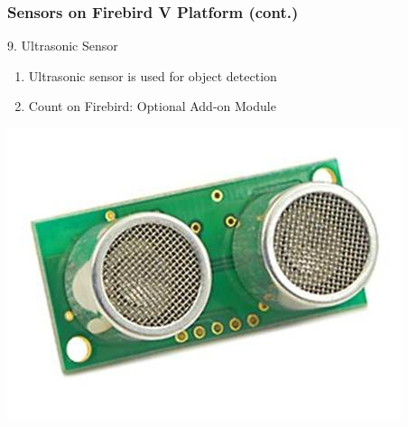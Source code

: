\documentclass[10pt,red]{beamer}
\begin{document}
\begin{frame}
	\frametitle{Sensors on Firebird V Platform (cont.)} 
	9. Ultrasonic Sensor	\pause
		\vfill
		\begin{minipage}[c]{0.5\textwidth}
			\begin{enumerate}
				\item <+-|alert@+> Ultrasonic sensor is used for object detection \\[10pt]
				\item <+-|alert@+> Count on Firebird: Optional Add-on Module
			\end{enumerate}
		\end{minipage}
		\hfill
		\begin{minipage}[c]{0.4\textwidth}
			\includegraphics[width=\linewidth]{ultrasonic}
		\end{minipage}	
\end{frame}
\end{document}
